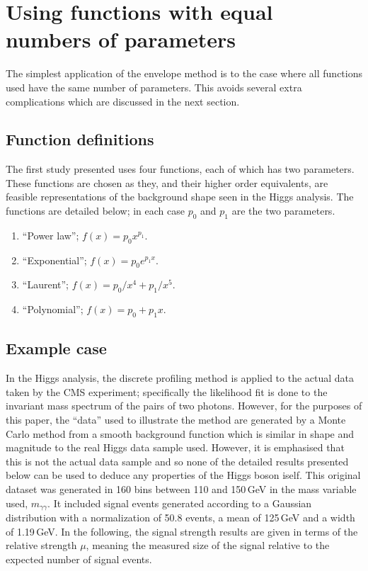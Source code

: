\section{Using functions with equal numbers of parameters} %
\label{sec:functions}

The simplest application of the envelope method is to the case where all
functions used have the same number of parameters. This avoids several extra
complications which are discussed in the next section.

\subsection{Function definitions}
\label{sec:functions:function}

The first study presented uses four functions, each of which has two parameters.
These functions are chosen as they, and their higher order equivalents,
are feasible representations of the background shape seen in the Higgs
analysis. The functions are detailed below; in each case $p_0$ and $p_1$ are
the two parameters.
\begin{enumerate}
\item
``Power law''; $f(x) = p_0 x^{p_1}$.
\item
``Exponential''; $f(x) = p_0 e^{p_1x}$.
\item
``Laurent''; $f(x) = p_0/x^4 + p_1/x^5$.
\item
``Polynomial''; $f(x) = p_0 + p_1 x$.
\end{enumerate}

\subsection{Example case}
\label{sec:functions:example}

In the Higgs analysis, the discrete profiling method is applied to
the actual data taken by the CMS experiment; specifically the likelihood fit
is done to the invariant mass spectrum of the pairs of two photons.
However, for the purposes of this
paper, the ``data'' used to illustrate the method are generated by a Monte Carlo
method from a smooth background
function which is similar in shape and magnitude to the
real Higgs data sample used. However, it is emphasised that this is not the 
actual data sample and so 
none of the detailed results presented below can be used to deduce any
properties of the Higgs boson iself.
This original dataset was generated in 160 bins between 110 and 150\,GeV in
the mass variable used, $m_{\gamma\gamma}$.
It included signal events
generated according to a Gaussian distribution with a normalization of 50.8 events, a mean of 125\,GeV and a 
width of 1.19\,GeV. In the following, the signal strength results are given in
terms of the relative strength $\mu$, 
meaning the measured size of the signal relative
to the expected number of signal events. 

